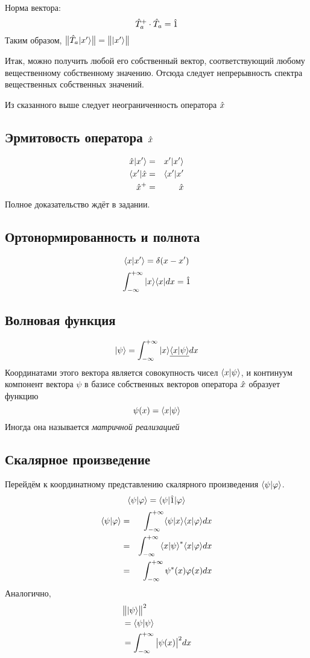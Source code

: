 Норма вектора:
$$
    \Hat T_a^+ \cdot \Hat T_a =  \Hat 1
$$
Таким образом, $\big\| \Hat T_a | x' \rangle \big\| = \big\| | x' \rangle \big\|$

Итак, можно получить любой его собственный вектор, соответствующий любому вещественному собственному значению.
Отсюда следует непрерывность спектра вещественных собственных значений.

\Rem Из сказанного выше следует неограниченность оператора $\Hat x$

\subsection{Эрмитовость оператора $\Hat x$}
\begin{eqnarray*}
    \Hat x | x' \rangle &=& x' | x' \rangle\\
    \langle x' | \Hat x &=& \langle x' | x'\\
    \Hat x^+       &=& \Hat x
\end{eqnarray*}
Полное доказательство ждёт в задании.

\subsection{Ортонормированность и полнота}
$$
    \langle x | x' \rangle = \delta{(x-x')}
$$
$$
    \int_{-\infty}^{+\infty} | x \rangle \langle x | dx = \Hat 1
$$
\subsection{Волновая функция}
$$
    | \psi \rangle = \int_{-\infty}^{+\infty} | x \rangle \underline{\langle x | \psi \rangle} dx
$$
Координатами этого вектора является совокупность чисел $\langle x | \psi \rangle$, и континуум компонент вектора $\psi$ в базисе собственных векторов оператора $\Hat x$ образует функцию
$$
    \psi(x) = \langle x | \psi \rangle
$$
Иногда она называется \emph{матричной реализацией}
\subsection{Скалярное произведение}
Перейдём к координатному представлению скалярного произведения $\langle \psi | \varphi \rangle$.
$$
    \langle \psi | \varphi \rangle = { \langle \psi |\Hat 1| \varphi \rangle }
$$
\begin{eqnarray*}
    \langle \psi | \varphi \rangle &=& \int_{-\infty}^{+\infty} \langle \psi | x \rangle \langle x | \varphi \rangle dx\\
    &=& \int_{-\infty}^{+\infty} {\langle x | \psi \rangle}^\ast \langle x | \varphi \rangle dx\\
    &=& \int_{-\infty}^{+\infty} \psi^\ast (x) \varphi(x) dx
\end{eqnarray*}
Аналогично,
\begin{eqnarray*}
    & \big\| | \psi \rangle \big\|^2\\
    &= \langle \psi | \psi \rangle\\
    &= \int_{-\infty}^{+\infty}  \big|\psi(x)\big|^2 dx
\end{eqnarray*}

